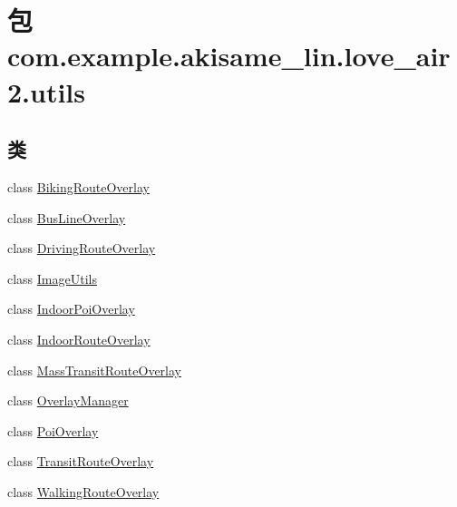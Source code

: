 \hypertarget{namespacecom_1_1example_1_1akisame__lin_1_1love__air2_1_1utils}{}\section{包 com.\+example.\+akisame\+\_\+lin.\+love\+\_\+air2.\+utils}
\label{namespacecom_1_1example_1_1akisame__lin_1_1love__air2_1_1utils}
\subsection*{类}
\begin{DoxyCompactItemize}
\item 
class \mbox{\hyperlink{classcom_1_1example_1_1akisame__lin_1_1love__air2_1_1utils_1_1_biking_route_overlay}{Biking\+Route\+Overlay}}
\item 
class \mbox{\hyperlink{classcom_1_1example_1_1akisame__lin_1_1love__air2_1_1utils_1_1_bus_line_overlay}{Bus\+Line\+Overlay}}
\item 
class \mbox{\hyperlink{classcom_1_1example_1_1akisame__lin_1_1love__air2_1_1utils_1_1_driving_route_overlay}{Driving\+Route\+Overlay}}
\item 
class \mbox{\hyperlink{classcom_1_1example_1_1akisame__lin_1_1love__air2_1_1utils_1_1_image_utils}{Image\+Utils}}
\item 
class \mbox{\hyperlink{classcom_1_1example_1_1akisame__lin_1_1love__air2_1_1utils_1_1_indoor_poi_overlay}{Indoor\+Poi\+Overlay}}
\item 
class \mbox{\hyperlink{classcom_1_1example_1_1akisame__lin_1_1love__air2_1_1utils_1_1_indoor_route_overlay}{Indoor\+Route\+Overlay}}
\item 
class \mbox{\hyperlink{classcom_1_1example_1_1akisame__lin_1_1love__air2_1_1utils_1_1_mass_transit_route_overlay}{Mass\+Transit\+Route\+Overlay}}
\item 
class \mbox{\hyperlink{classcom_1_1example_1_1akisame__lin_1_1love__air2_1_1utils_1_1_overlay_manager}{Overlay\+Manager}}
\item 
class \mbox{\hyperlink{classcom_1_1example_1_1akisame__lin_1_1love__air2_1_1utils_1_1_poi_overlay}{Poi\+Overlay}}
\item 
class \mbox{\hyperlink{classcom_1_1example_1_1akisame__lin_1_1love__air2_1_1utils_1_1_transit_route_overlay}{Transit\+Route\+Overlay}}
\item 
class \mbox{\hyperlink{classcom_1_1example_1_1akisame__lin_1_1love__air2_1_1utils_1_1_walking_route_overlay}{Walking\+Route\+Overlay}}
\end{DoxyCompactItemize}
